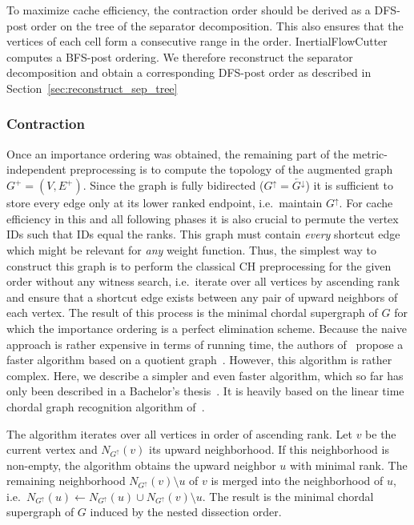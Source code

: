 \documentclass[a4paper, english, cleveref]{lipics-v2021}
\newcommand*{\gchu}{G^{\uparrow}}
\newcommand*{\rgchd}{\overleftarrow{G^{\downarrow}}}
\begin{document}
To maximize cache efficiency, the contraction order should be derived as a DFS-post order on the tree of the separator decomposition.
This also ensures that the vertices of each cell form a consecutive range in the order.
InertialFlowCutter computes a BFS-post ordering.
We therefore reconstruct the separator decomposition and obtain a corresponding DFS-post order as described in Section~\ref{sec:reconstruct_sep_tree}

\subsubsection{Contraction}

Once an importance ordering was obtained, the remaining part of the metric-independent preprocessing is to compute the topology of the augmented graph $G^+=(V, E^+)$.
Since the graph is fully bidirected ($\gchu = \rgchd$) it is sufficient to store every edge only at its lower ranked endpoint, i.e.\ maintain $\gchu$.
For cache efficiency in this and all following phases it is also crucial to permute the vertex IDs such that IDs equal the ranks.
This graph must contain \emph{every} shortcut edge which might be relevant for \emph{any} weight function.
Thus, the simplest way to construct this graph is to perform the classical CH preprocessing for the given order without any witness search, i.e.\ iterate over all vertices by ascending rank and ensure that a shortcut edge exists between any pair of upward neighbors of each vertex.
The result of this process is the minimal chordal supergraph of $G$ for which the importance ordering is a perfect elimination scheme.
Because the naive approach is rather expensive in terms of running time, the authors of~\cite{DibbeltSW16} propose a faster algorithm based on a quotient graph~\cite{TODO}.
However, this algorithm is rather complex.
Here, we describe a simpler and even faster algorithm, which so far has only been described in a Bachelor's thesis~\cite{TODO}.
It is heavily based on the linear time chordal graph recognition algorithm of~\cite{TODO}.

The algorithm iterates over all vertices in order of ascending rank.
Let $v$ be the current vertex and $N_{\gchu}(v)$ its upward neighborhood.
If this neighborhood is non-empty, the algorithm obtains the upward neighbor $u$ with minimal rank.
The remaining neighborhood $N_{\gchu}(v) \setminus u$ of $v$ is merged into the neighborhood of $u$, i.e.\ $N_{\gchu}(u) \gets N_{\gchu}(u) \cup N_{\gchu}(v) \setminus u$.
The result is the minimal chordal supergraph of $G$ induced by the nested dissection order.
\end{document}
